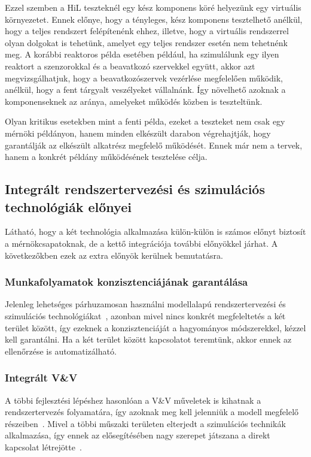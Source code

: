         Ezzel szemben a HiL teszteknél egy kész komponens köré helyezünk egy virtuális környezetet.
        Ennek előnye, hogy a tényleges, kész komponens tesztelhető anélkül, hogy a teljes rendszert felépítenénk ehhez, illetve, hogy a virtuális rendszerrel olyan dolgokat is tehetünk, amelyet egy teljes rendszer esetén nem tehetnénk meg.
        A korábbi reaktoros példa esetében például, ha szimulálunk egy ilyen reaktort a szenzorokkal és a beavatkozó szervekkel együtt, akkor azt megvizsgálhatjuk, hogy a beavatkozószervek vezérlése megfelelően működik, anélkül, hogy a fent tárgyalt veszélyeket vállalnánk.
        Így növelhető azoknak a komponenseknek az aránya, amelyeket működés közben is teszteltünk.
        
        Olyan kritikus esetekben mint a fenti példa, ezeket a teszteket nem csak egy mérnöki példányon, hanem minden elkészült darabon végrehajtják, hogy garantálják az elkészült alkatrész megfelelő működését.
        Ennek már nem a tervek, hanem a konkrét példány működésének tesztelése célja.

    \subsection{Integrált rendszertervezési és szimulációs technológiák előnyei} \label{IntegracioElonyei}
    Látható, hogy a két technológia alkalmazása külön-külön is számos előnyt biztosít a mérnökcsapatoknak, de a kettő integrációja további előnyökkel járhat.
    A következőkben ezek az extra előnyök kerülnek bemutatásra.

        \subsubsection{Munkafolyamatok konzisztenciájának garantálása}
        Jelenleg lehetséges párhuzamosan használni modellalapú rendszertervezési és szimulációs technológiákat~\cite{Gianni2017}, azonban mivel nincs konkrét megfeleltetés a két terület között, így ezeknek a konzisztenciáját a hagyományos módszerekkel, kézzel kell garantálni.
        Ha a két terület között kapcsolatot teremtünk, akkor ennek az ellenőrzése is automatizálható.

        \subsubsection{Integrált V\&V}
        A többi fejlesztési lépéshez hasonlóan a V\&V műveletek is kihatnak a rendszertervezés folyamatára, így azoknak meg kell jelenniük a modell megfelelő részeiben~\cite{Bajaj_2022}.
        Mivel a többi műszaki területen elterjedt a szimulációs technikák alkalmazása, így ennek az elősegítésében nagy szerepet játszana a direkt kapcsolat létrejötte~\cite{Ma_2022}.
        
